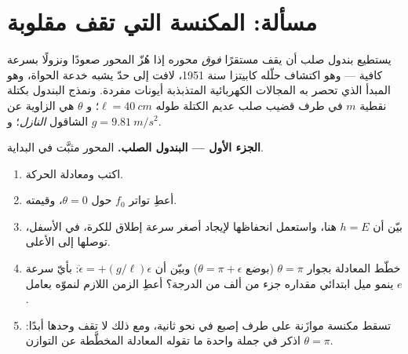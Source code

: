 \section{مسألة: المكنسة التي تقف مقلوبة}

\begin{problem}\label{pb:b3:lagrangian-mechanics:1}
يستطيع بندول صلب أن يقف مستقرًا \emph{فوق} محوره إذا هُزّ المحور
صعودًا ونزولًا بسرعة كافية --- وهو اكتشاف حلّله كابيتزا سنة 1951،
لافت إلى حدّ يشبه خدعة الحواة، وهو المبدأ الذي تحصر به المجالات
الكهربائية المتذبذبة أيونات مفردة. ونمذج البندول بكتلة نقطية $m$
في طرف قضيب صلب عديم الكتلة طوله $\ell = \qty{40}{cm}$؛ و $\theta$
هي الزاوية عن الشاقول \emph{النازل}؛ و $g = \qty{9.81}{m/s^2}$.

\medskip\noindent\textbf{الجزء الأول --- البندول الصلب.}
المحور مثبَّت في البداية.
\begin{enumerate}
  \item اكتب  ومعادلة الحركة.
  \item أعطِ تواتر  $f_0$ حول $\theta =
        0$، وقيمته.
  \item بيّن أن $h = E$ هنا، واستعمل انحفاظها لإيجاد أصغر سرعة
        إطلاق للكرة، في الأسفل، توصلها إلى الأعلى.
  \item خطّط المعادلة بجوار $\theta = \pi$ (بوضع $\theta = \pi +
        \epsilon$) وبيّن أن $\ddot\epsilon = +(g/\ell)\epsilon$: بأيّ
        سرعة ينمو ميل ابتدائي مقداره جزء من ألف من الدرجة؟ أعطِ
        الزمن اللازم لنموّه بعامل $e$.
  \item تسقط مكنسة موازَنة على طرف إصبع في نحو ثانية، ومع ذلك لا
        تقف وحدها أبدًا: اذكر في جملة واحدة ما تقوله المعادلة
        المخطَّطة عن التوازن $\theta = \pi$.
\end{enumerate}


\end{problem}
